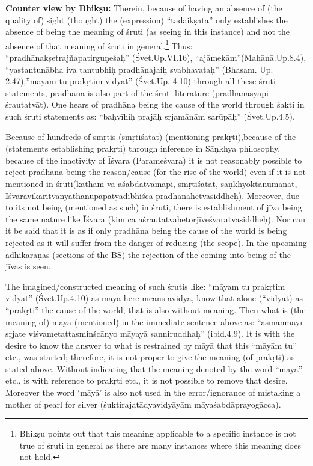 \textbf{Counter view by Bhikṣu:} Therein, because of having an absence of (the quality of) sight (thought) the (expression) “tadaikṣata” only establishes the absence of being the meaning of śruti (as seeing in this instance) and not the absence of that meaning of śruti in general.\footnote{Bhikṣu points out that this meaning applicable to a specific instance is not true of śruti in general as there are many instances where this meaning does not hold.} Thus: “pradhānakṣetrajñapatirguṇeśaḥ” (Śvet.Up.VI.16), “ajāmekām”(Mahānā.Up.8.4), “yastantunābha iva tantubhiḥ pradhānajaiḥ svabhavataḥ” (Bhasam. Up. 2.47),”māyām tu prakṛtim vidyāt” (Śvet.Up. 4.10) through all these śruti statements, pradhāna is also part of the śruti literature (pradhānasyāpi śrautatvāt). One hears of pradhāna being the cause of the world through śakti in such śruti statements as: “baḥvīhiḥ prajāḥ sṛjamānām sarūpāḥ” (Śvet.Up.4.5).

Because of hundreds of smṛtis (smṛtiśatāt) (mentioning prakṛti),\break because of the (statements establishing prakṛti) through inference in Sāṇkhya philosophy, because of the inactivity of Īśvara (Parameśvara) it is not reasonably possible to reject pradhāna being the reason/cause (for the rise of the world) even if it is not mentioned in śruti(katham vā aśabdatvamapi, smṛtiśatāt, sāṇkhyoktānumānāt, Īśvarāvikāritvānya\-thānupapatyādibhiśca pradhānahetvasiddheḥ). Moreover, due to its not being (mentioned as such) in śruti, there is establishment of jīva being the same nature like Īśvara (kim ca aśrautatvahetorjīveśvaratvasiddheḥ). Nor can it be said that it is as if only pradhāna being the cause of the world is being rejected as it will suffer from the danger of reducing (the scope). In the upcoming adhikaraṇas (sections of the BS) the rejection of the coming into being of the jīvas is seen.

\vskip 5pt

The imagined/constructed meaning of such śrutis like: “māyam tu prakṛtim vidyāt” (Śvet.Up.4.10)  as māyā here means avidyā, know that alone (“vidyāt) as “prakṛti” the cause of the world, that is also without meaning. Then what is (the meaning of) māyā (mentioned) in the immediate sentence above as: “asmānmāyī sṛjate viśvametattasminścānyo māyayā sanniruddhaḥ” (ibid.4.9). It is with the desire to know the answer to what is restrained by māyā that this “māyām tu” etc., was started; therefore, it is not proper to give the meaning (of prakṛti) as stated above. Without indicating that the meaning denoted by the word “māyā” etc., is with reference to prakṛti etc., it is not possible to remove that desire. Moreover the word ‘māyā’ is also not used in the error/ignorance of mistaking a mother of pearl for silver (śuktirajatādyavidyāyām māyaśabdāprayogācca).

